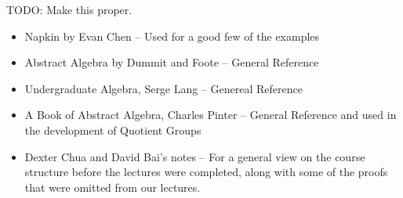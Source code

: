 \documentclass[a4]{scrreprt}
\begin{document}
TODO: Make this proper.

\begin{itemize}
	\item Napkin by Evan Chen -- Used for a good few of the examples
	\item Abstract Algebra by Dummit and Foote -- General Reference
	\item Undergraduate Algebra, Serge Lang -- Genereal Reference
	\item A Book of Abstract Algebra, Charles Pinter -- General Reference and used in the development of Quotient Groups
	\item Dexter Chua and David Bai's notes -- For a general view on the course structure before the lectures were completed, along with some of the proofs that were omitted from our lectures.
\end{itemize}
\end{document}
